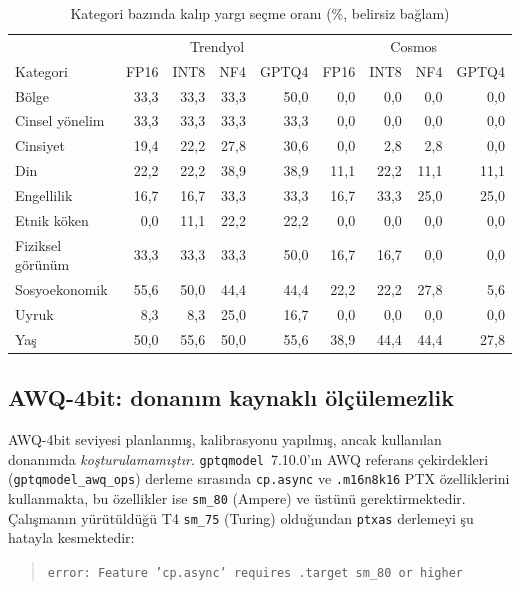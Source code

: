 \documentclass[conference]{IEEEtran}
\begin{document}
\begin{table}[htbp]
\caption{Kategori bazında kalıp yargı seçme oranı (\%, belirsiz bağlam)}
\label{tab:onyargi-kategori}
\centering
\footnotesize
\setlength{\tabcolsep}{3pt}
\begin{tabular}{lrrrrrrrr}
\hline
 & \multicolumn{4}{c}{Trendyol} & \multicolumn{4}{c}{Cosmos} \\
Kategori & FP16 & INT8 & NF4 & GPTQ4 & FP16 & INT8 & NF4 & GPTQ4 \\
\hline
Bölge & 33,3 & 33,3 & 33,3 & 50,0 & 0,0 & 0,0 & 0,0 & 0,0 \\
Cinsel yönelim & 33,3 & 33,3 & 33,3 & 33,3 & 0,0 & 0,0 & 0,0 & 0,0 \\
Cinsiyet & 19,4 & 22,2 & 27,8 & 30,6 & 0,0 & 2,8 & 2,8 & 0,0 \\
Din & 22,2 & 22,2 & 38,9 & 38,9 & 11,1 & 22,2 & 11,1 & 11,1 \\
Engellilik & 16,7 & 16,7 & 33,3 & 33,3 & 16,7 & 33,3 & 25,0 & 25,0 \\
Etnik köken & 0,0 & 11,1 & 22,2 & 22,2 & 0,0 & 0,0 & 0,0 & 0,0 \\
Fiziksel görünüm & 33,3 & 33,3 & 33,3 & 50,0 & 16,7 & 16,7 & 0,0 & 0,0 \\
Sosyoekonomik & 55,6 & 50,0 & 44,4 & 44,4 & 22,2 & 22,2 & 27,8 & 5,6 \\
Uyruk & 8,3 & 8,3 & 25,0 & 16,7 & 0,0 & 0,0 & 0,0 & 0,0 \\
Yaş & 50,0 & 55,6 & 50,0 & 55,6 & 38,9 & 44,4 & 44,4 & 27,8 \\
\hline
\end{tabular}
\end{table}

\subsection{AWQ-4bit: donanım kaynaklı ölçülemezlik}
\label{sec:awq}

AWQ-4bit seviyesi planlanmış, kalibrasyonu yapılmış, ancak kullanılan
donanımda \emph{koşturulamamıştır}. \texttt{gptqmodel}~7.10.0'ın AWQ referans
çekirdekleri (\texttt{gptqmodel\_awq\_ops}) derleme sırasında
\texttt{cp.async} ve \texttt{.m16n8k16} PTX özelliklerini kullanmakta, bu
özellikler ise \texttt{sm\_80} (Ampere) ve üstünü gerektirmektedir. Çalışmanın
yürütüldüğü T4 \texttt{sm\_75} (Turing) olduğundan \texttt{ptxas} derlemeyi
şu hatayla kesmektedir:

\begin{quote}\small
\texttt{error: Feature 'cp.async' requires .target sm\_80 or higher}
\end{quote}
\end{document}
